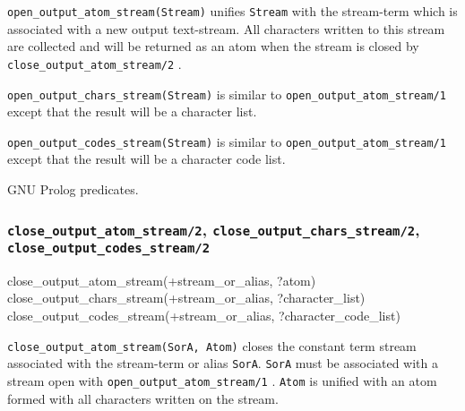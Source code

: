 \Description

\texttt{open\_output\_atom\_stream(Stream)} unifies \texttt{Stream} with the
stream-term which is associated with a new output text-stream. All characters
written to this stream are collected and will be returned as an atom when
the stream is closed by \texttt{close\_output\_atom\_stream/2}
.

\texttt{open\_output\_chars\_stream(Stream)} is similar to
\texttt{open\_output\_atom\_stream/1} except that the result will be a
character list.

\texttt{open\_output\_codes\_stream(Stream)} is similar to
\texttt{open\_output\_atom\_stream/1} except that the result will be a
character code list.

\begin{PlErrors}


\end{PlErrors}

\Portability

GNU Prolog predicates.

\subsubsection{\texttt{close\_output\_atom\_stream/2},
               \texttt{close\_output\_chars\_stream/2}, \\
               \texttt{close\_output\_codes\_stream/2}}
\label{close-output-atom-stream/2}

\begin{TemplatesOneCol}
close\_output\_atom\_stream(+stream\_or\_alias, ?atom)\\
close\_output\_chars\_stream(+stream\_or\_alias, ?character\_list)\\
close\_output\_codes\_stream(+stream\_or\_alias, ?character\_code\_list)

\end{TemplatesOneCol}

\Description

\texttt{close\_output\_atom\_stream(SorA, Atom)} closes the constant term
stream associated with the stream-term or alias \texttt{SorA}. \texttt{SorA} must
be associated with a stream open with \texttt{open\_output\_atom\_stream/1}
.  \texttt{Atom} is unified with an atom
formed with all characters written on the stream.

